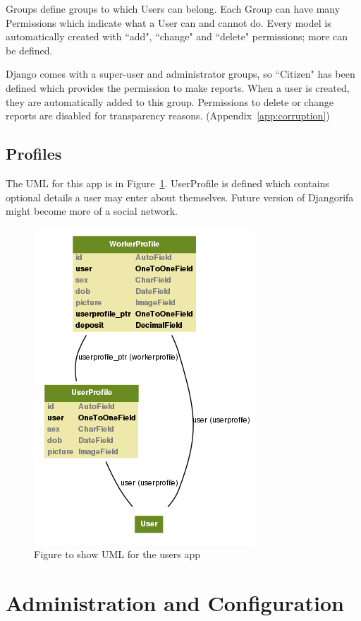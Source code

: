 Groups define groups to which Users can belong. Each Group can have many Permissions which indicate what a User can and cannot do. Every model is automatically created with ``add", ``change" and ``delete" permissions; more can be defined.

Django comes with a super-user and  administrator groups, so ``Citizen" has been defined which provides the permission to make reports. When a user is created, they are automatically added to this group. Permissions to delete or change reports are disabled for transparency reasons. (Appendix~\ref{app:corruption})

\subsection{Profiles}
\label{sec:profiles}

The UML for this app is in Figure~\ref{fig:users}. UserProfile is defined which contains optional details a user may enter about themselves. Future version of Djangorifa might become more of a social network.

\begin{figure}
\centering
\includegraphics[scale=0.51]{img/users.png}
\caption{Figure to show UML for the users app}
\label{fig:users}
\end{figure}

\section{Administration and Configuration}
\label{sec:di:admin}

